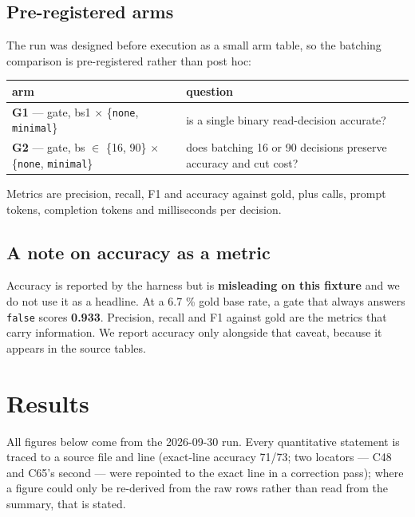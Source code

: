 \documentclass[11pt,a4paper]{article}
\begin{document}
\subsection{Pre-registered arms}

The run was designed before execution as a small arm table, so the batching comparison is pre-registered rather than post hoc:


\begin{center}
\begin{tabular}{@{}>{\raggedright\arraybackslash}p{}>{\raggedright\arraybackslash}p{}@{}}
\hline
\textbf{arm} & \textbf{question} \\ \hline
\textbf{G1} --- gate, bs1 $\times$ \{\texttt{none}, \texttt{minimal}\} & is a single binary read-decision accurate? \\ \hline
\textbf{G2} --- gate, bs $\in$ \{16, 90\} $\times$ \{\texttt{none}, \texttt{minimal}\} & does batching 16 or 90 decisions preserve accuracy and cut cost? \\ \hline
\end{tabular}
\end{center}

Metrics are precision, recall, F1 and accuracy against gold, plus calls, prompt tokens, completion tokens and milliseconds per decision.

\subsection{A note on accuracy as a metric}

Accuracy is reported by the harness but is \textbf{misleading on this fixture} and we do not use it as a headline. At a 6.7 \% gold base rate, a gate that always answers \texttt{false} scores \textbf{0.933}. Precision, recall and F1 against gold are the metrics that carry information. We report accuracy only alongside that caveat, because it appears in the source tables.

\section{Results}

All figures below come from the 2026-09-30 run. Every quantitative statement is traced to a source file and line (exact-line accuracy 71/73; two locators --- C48 and C65's second --- were repointed to the exact line in a correction pass); where a figure could only be re-derived from the raw rows rather than read from the summary, that is stated.
\end{document}
